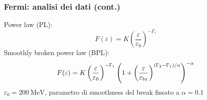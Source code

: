 \documentclass[10pt]{beamer}
\renewcommand{\epsilon}{\varepsilon}
\begin{document}
\begin{frame}
  \frametitle{Fermi: analisi dei dati (cont.)}
  Power law (PL):
  \begin{equation*}
    F(\epsilon) = K
    \left(
      \frac{\epsilon}{\epsilon_{0}}
    \right)^{-\Gamma_{1}}
  \end{equation*}
  Smoothly broken power law (BPL):
  \begin{equation*}
    F(\epsilon) = K
    \left(
      \frac{\epsilon}{\epsilon_{0}}
    \right)^{-\Gamma_{1}}
    \left(
      1 +
      \left(
        \frac{\epsilon}{\epsilon_{\textup{br}}}
      \right)^{(\Gamma_{2} - \Gamma_{1})/\alpha}
    \right)^{-\alpha}
  \end{equation*}
  $\epsilon_{0} = \SI{200}{\mega \electronvolt}$, parametro di smoothness del
  break fissato a $\alpha = 0.1$
  \begin{table}
    \centering
  \end{table}
\end{frame}
\end{document}
